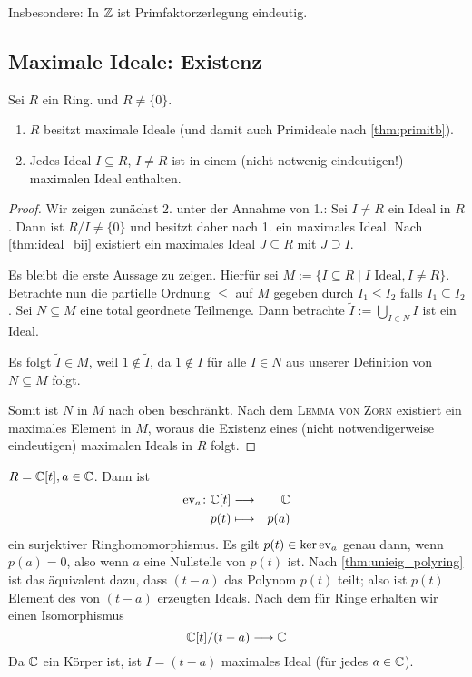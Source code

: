 \documentclass[12pt,a4paper]{scrartcl}
\begin{document}
\begin{bem}
	Insbesondere: In $\mathbb Z$ ist Primfaktorzerlegung \glqq eindeutig\grqq.
\end{bem}

\subsection{Maximale Ideale: Existenz}
\begin{satz}\label{thm:max_ideal_ex}
	Sei $R$ ein Ring.
	und $R \neq \{0\}$.
	\begin{enumerate}
		\item $R$ besitzt maximale Ideale (und damit auch Primideale nach \cref{thm:primitb}).
		\item Jedes Ideal $I\subseteq R$, $I \neq R$ ist in einem (nicht notwenig eindeutigen!) maximalen Ideal enthalten.
	\end{enumerate}
\end{satz}
\begin{proof}
	Wir zeigen zunächst 2. unter der Annahme von 1.: Sei $I\neq R$ ein Ideal in $R$. Dann ist $R/I \neq \{0\}$  und besitzt daher nach 1. ein maximales Ideal. Nach \cref{thm:ideal_bij} existiert ein maximales Ideal $J\subseteq R$ mit $J\supseteq I$.
	
	
	Es bleibt die erste Aussage zu zeigen. Hierfür sei $M := \{I\subseteq R\mid I\text{ Ideal}, I \neq R\}$. Betrachte nun die partielle Ordnung $\leq$ auf $M$ gegeben durch $I_1\leq I_2$ falls $I_1\subseteq I_2$. Sei $N\subseteq M$ eine total geordnete Teilmenge. Dann betrachte $\tilde{I} := \bigcup\limits_{I\in N} I$ ist ein Ideal.
	
	Es folgt $\tilde{I}\in M$, weil $1\notin \tilde{I}$, da $1\notin I$ für alle $ I\in N$ aus unserer Definition von $N\subseteq M$ folgt.
	
	Somit ist $N$ in $M$ nach oben beschränkt. Nach dem \textsc{Lemma von Zorn} existiert ein maximales Element in $M$, woraus die Existenz eines (nicht notwendigerweise eindeutigen) maximalen Ideals in $R$ folgt.
\end{proof}
\begin{bsp}
	$R = \mathbb C[t], a\in \mathbb C$. Dann ist
	\begin{eqnarray*}
		\operatorname{ev}_a\colon \mathbb C[t] & \longrightarrow & \mathbb C\\
		p(t) & \longmapsto & p(a)
	\end{eqnarray*}
	ein surjektiver Ringhomomorphismus. Es gilt $p(t) \in \operatorname{ker}\operatorname{ev}_a$ genau dann, wenn $p(a) = 0$, also wenn $a$ eine Nullstelle von $p(t)$ ist. Nach \cref{thm:unieig_polyring} ist das äquivalent dazu, dass $(t-a)$ das Polynom $p(t)$ teilt; also ist $p(t)$ Element des von $(t-a)$ erzeugten Ideals. Nach dem  für Ringe erhalten wir einen Isomorphismus
	$$ \mathbb C[t]/(t-a) \longrightarrow \mathbb C$$
	Da $\mathbb C$ ein Körper ist, ist $I = (t-a)$ maximales Ideal (für jedes $a\in \mathbb C$).
\end{bsp}
\end{document}

